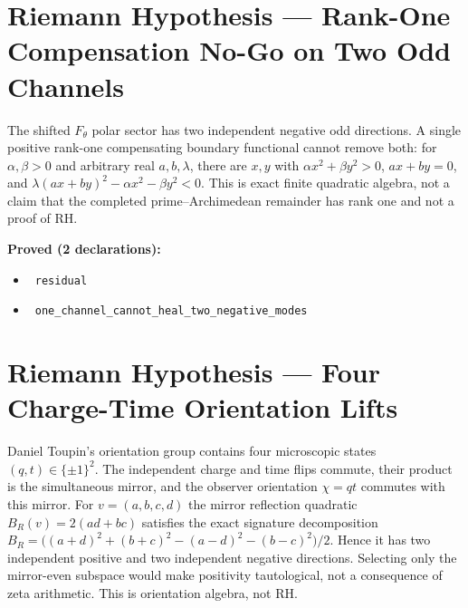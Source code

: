 \documentclass{report}
\theoremstyle{definition}
\begin{document}
\section{Riemann Hypothesis --- Rank-One Compensation No-Go on Two Odd Channels}
The shifted $F_\theta$ polar sector has two independent negative odd directions. A single
positive rank-one compensating boundary functional cannot remove both:
for $\alpha,\beta>0$ and arbitrary real $a,b,\lambda$, there are $x,y$ with
$\alpha x^2+\beta y^2>0$, $ax+by=0$, and
$\lambda(ax+by)^2-\alpha x^2-\beta y^2<0$.
This is exact finite quadratic algebra, not a claim that the completed
prime--Archimedean remainder has rank one and not a proof of RH.

\noindent\textbf{Proved (2 declarations):}
\begin{itemize}
  \item {}\leanok\ \texttt{residual}
  \item {}\leanok\ \texttt{one\_channel\_cannot\_heal\_two\_negative\_modes}
\end{itemize}

\section{Riemann Hypothesis --- Four Charge-Time Orientation Lifts}
Daniel Toupin's orientation group contains four microscopic states
$(q,t)\in\{\pm1\}^2$.
The independent charge and time flips commute, their product is the simultaneous
mirror, and the observer orientation $\chi=qt$ commutes with this mirror.
For $v=(a,b,c,d)$ the mirror reflection quadratic
$B_R(v)=2(ad+bc)$ satisfies the exact signature decomposition
$B_R=\bigl((a+d)^2+(b+c)^2-(a-d)^2-(b-c)^2\bigr)/2$.
Hence it has two independent positive and two independent negative directions.
Selecting only the mirror-even subspace would make positivity tautological,
not a consequence of zeta arithmetic. This is orientation algebra, not RH.
\end{document}
